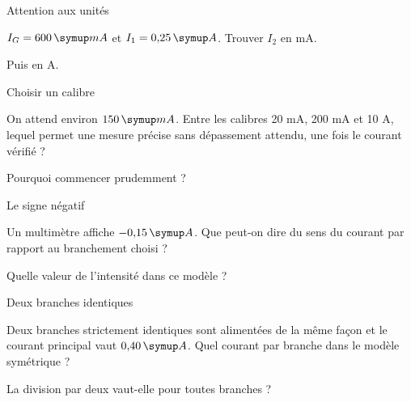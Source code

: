 \par\noindent\begin{minipage}{\linewidth}
\begin{exercice}[2]{Attention aux unités}
\begin{questions}
\item $I_G=600\unite{mA}$ et $I_1=0{,}25\unite A$. Trouver $I_2$ en mA.
\item Puis en A.
\end{questions}
\end{exercice}
\end{minipage}
\par\noindent\begin{minipage}{\linewidth}
\begin{exercice}[2]{Choisir un calibre}
\begin{questions}
\item On attend environ $150\unite{mA}$. Entre les calibres 20 mA, 200 mA et 10 A, lequel permet une mesure précise sans dépassement attendu, une fois le courant vérifié ?
\item Pourquoi commencer prudemment ?
\end{questions}
\end{exercice}
\end{minipage}
\par\noindent\begin{minipage}{\linewidth}
\begin{exercice}[2]{Le signe négatif}
\begin{questions}
\item Un multimètre affiche $-0{,}15\unite A$. Que peut-on dire du sens du courant par rapport au branchement choisi ?
\item Quelle valeur de l’intensité dans ce modèle ?
\end{questions}
\end{exercice}
\end{minipage}
\par\noindent\begin{minipage}{\linewidth}
\begin{exercice}[2]{Deux branches identiques}
\begin{questions}
\item Deux branches strictement identiques sont alimentées de la même façon et le courant principal vaut $0{,}40\unite A$. Quel courant par branche dans le modèle symétrique ?
\item La division par deux vaut-elle pour toutes branches ?
\end{questions}
\end{exercice}
\end{minipage}
